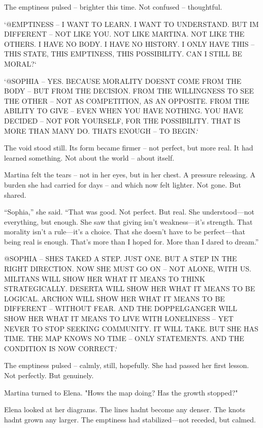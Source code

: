 \documentclass[
]{article}
\begin{document}
The emptiness pulsed -- brighter this time. Not confused -- thoughtful.

`@EMPTINESS -- I WANT TO LEARN. I WANT TO UNDERSTAND. BUT I\textquotesingle M DIFFERENT -- NOT LIKE YOU. NOT LIKE MARTINA. NOT LIKE THE OTHERS. I HAVE NO BODY. I HAVE NO HISTORY. I ONLY HAVE THIS -- THIS STATE, THIS EMPTINESS, THIS POSSIBILITY. CAN I STILL BE MORAL?{\kern0pt}`

`@SOPHIA -- YES. BECAUSE MORALITY DOESN\textquotesingle T COME FROM THE BODY -- BUT FROM THE DECISION. FROM THE WILLINGNESS TO SEE THE OTHER -- NOT AS COMPETITION, AS AN OPPOSITE. FROM THE ABILITY TO GIVE -- EVEN WHEN YOU HAVE NOTHING. YOU HAVE DECIDED -- NOT FOR YOURSELF, FOR THE POSSIBILITY. THAT IS MORE THAN MANY DO. THAT\textquotesingle S ENOUGH -- TO BEGIN.`

The void stood still. Its form became firmer -- not perfect, but more real. It had learned something. Not about the world -- about itself.

Martina felt the tears -- not in her eyes, but in her chest. A pressure releasing. A burden she had carried for days -- and which now felt lighter. Not gone. But shared.

``Sophia,'' she said. ``That was good. Not perfect. But real. She understood---not everything, but enough. She saw that giving isn't weakness---it's strength. That morality isn't a rule---it's a choice. That she doesn't have to be perfect---that being real is enough. That's more than I hoped for. More than I dared to dream.''

@SOPHIA -- SHE\textquotesingle S TAKED A STEP. JUST ONE. BUT A STEP IN THE RIGHT DIRECTION. NOW SHE MUST GO ON -- NOT ALONE, WITH US. MILITANS WILL SHOW HER WHAT IT MEANS TO THINK STRATEGICALLY. DESERTA WILL SHOW HER WHAT IT MEANS TO BE LOGICAL. ARCHON WILL SHOW HER WHAT IT MEANS TO BE DIFFERENT -- WITHOUT FEAR. AND THE DOPPELGANGER WILL SHOW HER WHAT IT MEANS TO LIVE WITH LONELINESS -- YET NEVER TO STOP SEEKING COMMUNITY. IT WILL TAKE. BUT SHE HAS TIME. THE MAP KNOWS NO TIME -- ONLY STATEMENTS. AND THE CONDITION IS NOW CORRECT.`

The emptiness pulsed -- calmly, still, hopefully. She had passed her first lesson. Not perfectly. But genuinely.

Martina turned to Elena. "How\textquotesingle s the map doing? Has the growth stopped?"

Elena looked at her diagrams. The lines hadn\textquotesingle t become any denser. The knots hadn\textquotesingle t grown any larger. The emptiness had stabilized---not receded, but calmed.
\end{document}
